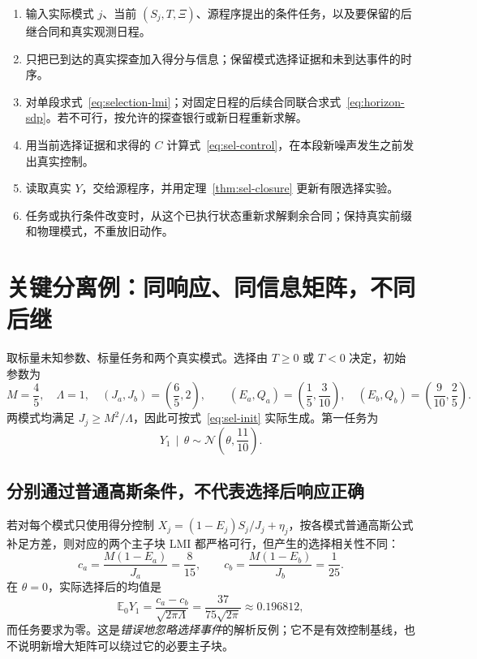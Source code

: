 \documentclass[UTF8,fontset=fandol,11pt,a4paper]{ctexart}
\newcommand{\N}{\mathcal N}
\newcommand{\E}{\mathbb E}
\newcommand{\given}{\,\mid\,}
\theoremstyle{definition}
\theoremstyle{remark}
\numberwithin{equation}{section}
\begin{document}
\begin{keybox}[title={执行算法：从当前证据重编译后缀}]
\begin{enumerate}
\item 输入实际模式 $j$、当前 $(S_j,T,\Xi)$、源程序提出的条件任务，以及要保留的后继合同和真实观测日程。
\item 只把已到达的真实探查加入得分与信息；保留模式选择证据和未到达事件的时序。
\item 对单段求式~\eqref{eq:selection-lmi}；对固定日程的后续合同联合求式~\eqref{eq:horizon-sdp}。若不可行，按允许的探查银行或新日程重新求解。
\item 用当前选择证据和求得的 $C$ 计算式~\eqref{eq:sel-control}，在本段新噪声发生之前发出真实控制。
\item 读取真实 $Y$，交给源程序，并用定理~\ref{thm:sel-closure} 更新有限选择实验。
\item 任务或执行条件改变时，从这个已执行状态重新求解剩余合同；保持真实前缀和物理模式，不重放旧动作。
\end{enumerate}
\end{keybox}

\section{关键分离例：同响应、同信息矩阵，不同后继}
\label{sec:separation}

取标量未知参数、标量任务和两个真实模式。选择由 $T\ge0$ 或 $T<0$ 决定，初始参数为
\begin{equation}
 M=\frac45,\quad\Lambda=1,\quad
 (J_a,J_b)=\left(\frac65,2\right),\qquad
 (E_a,Q_a)=\left(\frac15,\frac3{10}\right),\quad
 (E_b,Q_b)=\left(\frac9{10},\frac25\right).
 \label{eq:example-initial}
\end{equation}
两模式均满足 $J_j\ge M^2/\Lambda$，因此可按式~\eqref{eq:sel-init} 实际生成。第一任务为
\begin{equation}
 Y_1\given\theta\sim\N\!\left(\theta,\frac{11}{10}\right).
\end{equation}

\subsection{分别通过普通高斯条件，不代表选择后响应正确}
若对每个模式只使用得分控制 $X_j=(1-E_j)S_j/J_j+\eta_j$，按各模式普通高斯公式补足方差，则对应的两个主子块 LMI 都严格可行，但产生的选择相关性不同：
\[
 c_a=\frac{M(1-E_a)}{J_a}=\frac8{15},\qquad
 c_b=\frac{M(1-E_b)}{J_b}=\frac1{25}.
\]
在 $\theta=0$，实际选择后的均值是
\begin{equation}
 \E_0Y_1=\frac{c_a-c_b}{\sqrt{2\pi\Lambda}}
 =\frac{37}{75\sqrt{2\pi}}\approx0.196812,
 \label{eq:exact-selection-bias}
\end{equation}
而任务要求为零。这是\emph{错误地忽略选择事件}的解析反例；它不是有效控制基线，也不说明新增大矩阵可以绕过它的必要主子块。
\end{document}
